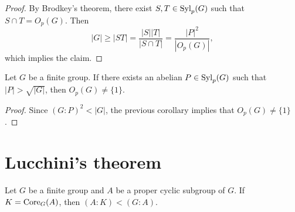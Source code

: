 \begin{proof}
	By Brodkey's theorem, there exist $S,T\in\mathrm{Syl}_p(G)$
	such that $S\cap T=O_p(G)$. Then 
	\[
		|G|\geq |ST|=\frac{|S||T|}{|S\cap T|}=\frac{|P|^2}{|O_p(G)|},
	\]
	which implies the claim. 
\end{proof}

\begin{corollary}
	Let $G$ be a finite group. If there exists an abelian $P\in\mathrm{Syl}_p(G)$ such that 
	$|P|>\sqrt{|G|}$, then $O_p(G)\ne\{1\}$.
\end{corollary}

\begin{proof}
	Since $(G:P)^2<|G|$, the previous corollary implies that 
	$O_p(G)\ne\{1\}$.
\end{proof}




\section{Lucchini's theorem}

\begin{theorem}[Lucchini]
	\label{thm:Lucchini}
	Let $G$ be a finite group and $A$ be a proper cyclic subgroup of $G$. If 
	$K=\operatorname{Core}_G(A)$, then $(A:K)<(G:A)$.
\end{theorem}

